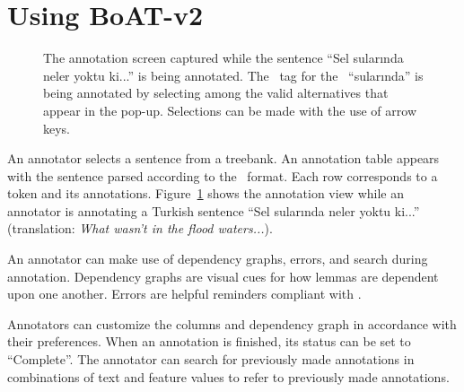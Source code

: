 \section{Using BoAT-v2}
\label{sec:annotation}


\begin{figure}[th!]
    \centering
    \caption{The annotation screen captured while the sentence ``Sel sularında neler yoktu ki...'' is being annotated. The \deprel\ tag for the \form\ ``sularında'' is being annotated by selecting among the valid alternatives that appear in the pop-up. Selections can be made with the use of arrow keys.}
    \label{fig:anno-fig}
\end{figure}


An annotator selects a sentence from a treebank.
An annotation table appears with the sentence parsed according to the \ud\ format.
Each row corresponds to a token and its annotations.
Figure~\ref{fig:anno-fig} shows the annotation view while an annotator is annotating a Turkish sentence ``Sel sularında neler yoktu ki...'' (translation: \textit{What wasn't in the flood waters...}).

An annotator can make use of dependency graphs, errors, and search during annotation.
Dependency graphs are visual cues for how lemmas are dependent upon one another.
Errors are helpful reminders compliant with \ud.

Annotators can customize the columns and dependency graph in accordance with their preferences.
When an annotation is finished, its status can be set to ``Complete''.
The annotator can search for previously made annotations in combinations of text and feature values to refer to previously made annotations.
